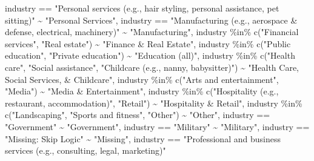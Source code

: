 \documentclass[
  12pt,
]{article}
\newenvironment{Shaded}{\begin{snugshade}}{\end{snugshade}}
\newcommand{\FunctionTok}[1]{\textcolor[rgb]{0.00,0.00,0.00}{#1}}
\newcommand{\NormalTok}[1]{#1}
\newcommand{\SpecialCharTok}[1]{\textcolor[rgb]{0.00,0.00,0.00}{#1}}
\newcommand{\StringTok}[1]{\textcolor[rgb]{0.31,0.60,0.02}{#1}}
\begin{document}
\begin{Shaded}
\begin{Highlighting}[]
\NormalTok{        industry }\SpecialCharTok{==} \StringTok{"Personal services (e.g., hair styling, personal assistance, pet sitting)"}
          \SpecialCharTok{\textasciitilde{}} \StringTok{"Personal Services"}\NormalTok{,}
\NormalTok{        industry }\SpecialCharTok{==} \StringTok{"Manufacturing (e.g., aerospace \& defense, electrical, machinery)"}
          \SpecialCharTok{\textasciitilde{}} \StringTok{"Manufacturing"}\NormalTok{,}
\NormalTok{        industry }\SpecialCharTok{\%in\%} \FunctionTok{c}\NormalTok{(}\StringTok{"Financial services"}\NormalTok{, }\StringTok{"Real estate"}\NormalTok{)}
          \SpecialCharTok{\textasciitilde{}} \StringTok{"Finance \& Real Estate"}\NormalTok{,}
\NormalTok{        industry }\SpecialCharTok{\%in\%} \FunctionTok{c}\NormalTok{(}\StringTok{"Public education"}\NormalTok{, }\StringTok{"Private education"}\NormalTok{)}
          \SpecialCharTok{\textasciitilde{}} \StringTok{"Education (all)"}\NormalTok{,}
\NormalTok{        industry }\SpecialCharTok{\%in\%} \FunctionTok{c}\NormalTok{(}\StringTok{"Health care"}\NormalTok{, }\StringTok{"Social assistance"}\NormalTok{, }\StringTok{"Childcare (e.g., nanny, babysitter)"}\NormalTok{)}
          \SpecialCharTok{\textasciitilde{}} \StringTok{"Health Care, Social Services, \& Childcare"}\NormalTok{,}
\NormalTok{        industry }\SpecialCharTok{\%in\%} \FunctionTok{c}\NormalTok{(}\StringTok{"Arts and entertainment"}\NormalTok{, }\StringTok{"Media"}\NormalTok{)}
          \SpecialCharTok{\textasciitilde{}} \StringTok{"Media \& Entertainment"}\NormalTok{,}
\NormalTok{        industry }\SpecialCharTok{\%in\%} \FunctionTok{c}\NormalTok{(}\StringTok{"Hospitality (e.g., restaurant, accommodation)"}\NormalTok{, }\StringTok{"Retail"}\NormalTok{)}
          \SpecialCharTok{\textasciitilde{}} \StringTok{"Hospitality \& Retail"}\NormalTok{,}
\NormalTok{        industry }\SpecialCharTok{\%in\%} \FunctionTok{c}\NormalTok{(}\StringTok{"Landscaping"}\NormalTok{, }\StringTok{"Sports and fitness"}\NormalTok{, }\StringTok{"Other"}\NormalTok{)}
          \SpecialCharTok{\textasciitilde{}} \StringTok{"Other"}\NormalTok{,}
\NormalTok{        industry }\SpecialCharTok{==} \StringTok{"Government"}
          \SpecialCharTok{\textasciitilde{}} \StringTok{"Government"}\NormalTok{,}
\NormalTok{        industry }\SpecialCharTok{==} \StringTok{"Military"}
          \SpecialCharTok{\textasciitilde{}} \StringTok{"Military"}\NormalTok{,}
\NormalTok{        industry }\SpecialCharTok{==} \StringTok{"Missing: Skip Logic"}
          \SpecialCharTok{\textasciitilde{}} \StringTok{"Missing"}\NormalTok{,}
\NormalTok{        industry }\SpecialCharTok{==} \StringTok{"Professional and business services (e.g., consulting, legal, marketing)"}

\end{Highlighting}
\end{Shaded}
\end{document}
